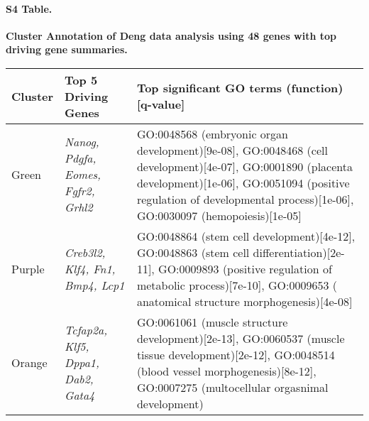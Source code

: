 \documentclass[10pt,letterpaper]{article}
\begin{document}
\paragraph*{S4 Table.}
\label{supptab4}
{\bf Cluster Annotation of Deng data analysis using 48 genes with top driving gene summaries.}

\begin{table}[!hp]
\begin{adjustwidth}{-.5in}{0in}
\begin{tabular}{|p{1.0in}|p{1.0in}|p{5.0in}|}
\hline
Cluster & Top 5 Driving \qquad Genes  &  Top significant GO terms (function)[q-value] \\
\hline
Green &  \textit{Nanog, Pdgfa, Eomes, Fgfr2, Grhl2} & GO:0048568 (embryonic organ development)[9e-08],
GO:0048468 (cell development)[4e-07],  GO:0001890 (placenta development)[1e-06], GO:0051094 (positive
regulation of developmental process)[1e-06],  GO:0030097 (hemopoiesis)[1e-05] \\ \hline
Purple &  \textit{Creb3l2, Klf4, Fn1, Bmp4, Lcp1} &  GO:0048864 (stem cell development)[4e-12], GO:0048863
(stem cell differentiation)[2e-11], GO:0009893 (positive regulation of metabolic process)[7e-10], GO:0009653 (
anatomical structure morphogenesis)[4e-08] \\ \hline
Orange & \textit{Tcfap2a, Klf5, Dppa1, Dab2, Gata4} & GO:0061061 (muscle structure development)[2e-13],
GO:0060537 (muscle tissue development)[2e-12], GO:0048514 (blood vessel morphogenesis)[8e-12],
GO:0007275 (multocellular orgasnimal development) \\ \hline
\end{tabular}
\end{adjustwidth}
\end{table}
\end{document}
